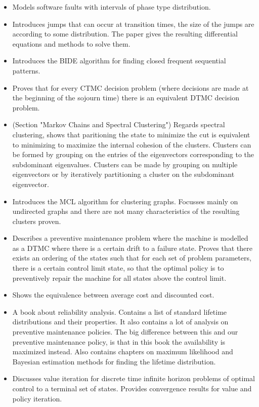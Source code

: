 \begin{itemize}
\item \citep{Okamura2006} Models software faults with intervals of phase type distribution.
\item\citep{Tzenova2005} Introduces jumps that can occur at transition times, the size of the jumps are according to some distribution. The paper gives the resulting differential equations and methods to solve them.
\item\citep{Wang2004} Introduces the BIDE algorithm for finding closed frequent sequential patterns.
\item\citep{Serfozo1979} Proves that for every CTMC decision problem (where decisions are made at the beginning of the sojourn time) there is an equivalent DTMC decision problem.
\item\citep{Liu2011} (Section "Markov Chains and Spectral Clustering") Regards spectral clustering, shows that paritioning the state to minimize the cut is equivalent to minimizing to maximize the internal cohesion of the clusters. Clusters can be formed by grouping on the entries of the eigenvectors corresponding to the subdominant eigenvalues. Clusters can be made by grouping on multiple eigenvectors or by iteratively partitioning a cluster on the subdominant eigenvector.
\item\citep{Dongen2000} Introduces the MCL algorithm for clustering graphs. Focusses mainly on undirected graphs and there are not many characteristics of the resulting clusters proven.
\item\citep{Derman1963} Describes a preventive maintenance problem where the machine is modelled as a DTMC where there is a certain drift to a failure state. Proves that there exists an ordering of the states such that for each set of problem parameters, there is a certain control limit state, so that the optimal policy is to preventively repair the machine for all states above the control limit.
\item\citep{Ross1970} Shows the equivalence between average cost and discounted cost.
\item\citep{Zacks2012} A book about reliability analysis. Contains a list of standard lifetime distributions and their properties. It also contains a lot of analysis on preventive maintenance policies. The big difference between this and our preventive maintenance policy, is that in this book the availability is maximized instead. Also contains chapters on maximum likelihood and Bayesian estimation methods for finding the lifetime distribution.
\item\citep{Bertsekas2017} Discusses value iteration for discrete time infinite horizon problems of optimal control to a terminal set of states. Provides convergence results for value and policy iteration.

\end{itemize}
